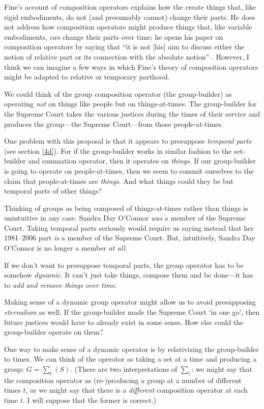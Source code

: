 \documentclass[11pt]{article}
\begin{document}
\begin{spacing}{1.5}
Fine's account of composition operators explains how the create things
that, like rigid embodiments, do not (and presumably cannot) change
their parts.  He does not address how composition operators might
produce things that, like variable embodiments, {\em can} change their
parts over time; he opens his paper on composition operators by saying
that ``it is not [his] aim to discuss either the notion of relative
part or its connection with the absolute notion''
\citeyearpar[559]{fine2010}.  However, I think we can imagine a few
ways in which Fine's theory of composition operators might be adapted
to relative or temporary parthood.


We could think of the group composition operator (the group-builder)
as operating {\em not} on things like people but on things-at-times.
The group-builder for the Supreme Court takes the various justices
during the times of their service and produces the group---the Supreme
Court---from those people-at-times.

One problem with this proposal is that it appears to presuppose {\em
  temporal parts} (see section \ref{4d}).  For if the group-builder
works in similar fashion to the set-builder and summation operator,
then it operates on {\em things}.  If our group-builder is going to
operate on people-at-times, then we seem to commit ourselves to the
claim that people-at-times are {\em things}.  And what things could
they be but temporal parts of other things?

Thinking of groups as being composed of things-at-times rather than
things is unintuitive in any case.  Sandra Day O'Connor \emph{was} a
member of the Supreme Court.  Taking temporal parts seriously would
require us saying instead that her 1981--2006 part \emph{is} a member
of the Supreme Court.  But, intuitively, Sandra Day O'Connor is no
longer a member {\em at all}.

If we don't want to presuppose temporal parts, the group operator has
to be somehow \emph{dynamic}. It can't just take things, compose them
and be done---it has to \emph{add and remove things over time}.

Making sense of a dynamic group operator might allow us to avoid
presupposing {\em eternalism} as well.  If the group-builder made the
Supreme Court `in one go', then future justices would have to already
exist in some sense.  How else could the group-builder operate on
them?

One way to make sense of a dynamic operator is by relativizing the
group-builder to times.  We can think of the operator as taking a set
at a time and producing a group: $G = \sum _{t} (S)$.  (There are two
interpretations of $\sum _{t}$: we might say that the composition
operator as (re-)producing a group at a number of different times $t$,
or we might say that there is a {\em different} composition operator
at each time $t$.  I will suppose that the former is correct.)


\end{spacing}
\end{document}
